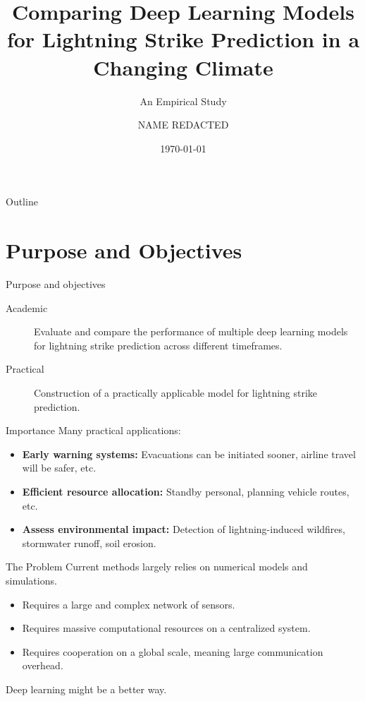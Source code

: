 \documentclass[10pt]{beamer}
\title{Comparing Deep Learning Models for Lightning Strike Prediction in a Changing Climate}
\subtitle{An Empirical Study}
\author{NAME REDACTED}
\institute{Blekinge Institute of Technology}
\date{\today}
\begin{document}
\begin{frame}
\titlepage
\end{frame}

\begin{frame}{Outline}
\tableofcontents
\end{frame}


\section{Purpose and Objectives}


\begin{frame}{Purpose and objectives}
\centering
\begin{description}
	\item[Academic] Evaluate and compare the performance of multiple deep learning models for lightning strike prediction across different timeframes.
	\item[Practical] Construction of a practically applicable model for lightning strike prediction.
\end{description}
\end{frame}


\begin{frame}{Importance}
Many practical applications:
\begin{itemize}
	\item \textbf{Early warning systems:} Evacuations can be initiated sooner, airline travel will be safer, etc.
	\item \textbf{Efficient resource allocation:} Standby personal, planning vehicle routes, etc.
	\item \textbf{Assess environmental impact:} Detection of lightning-induced wildfires, stormwater runoff, soil erosion.
\end{itemize}
\end{frame}


\begin{frame}{The Problem}
Current methods largely relies on numerical models and simulations.
\begin{itemize}
	\item Requires a large and complex network of sensors.
	\item Requires massive computational resources on a centralized system.
	\item Requires cooperation on a global scale, meaning large communication overhead.
\end{itemize}
Deep learning might be a better way.
\end{frame}
\end{document}

